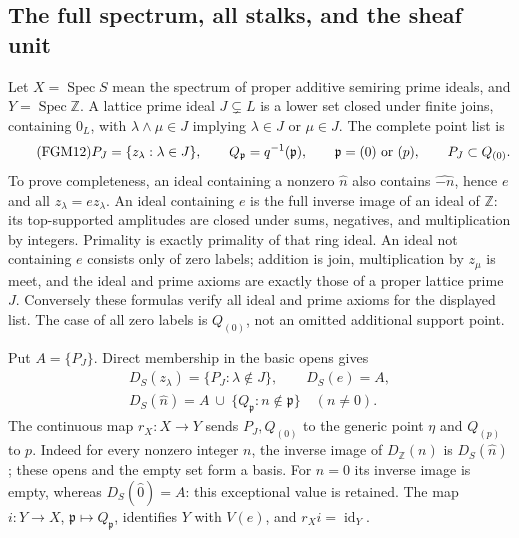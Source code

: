 \subsection{The full spectrum, all stalks, and the sheaf unit}
Let $X=\operatorname{Spec}S$ mean the spectrum of proper additive
semiring prime ideals, and $Y=\operatorname{Spec}\mathbb Z$.
A lattice prime ideal $J\subsetneq L$ is a lower set closed under
finite joins, containing $0_L$, with
$\lambda\wedge\mu\in J$ implying $\lambda\in J$ or $\mu\in J$.
The complete point list is
\begin{equation}\tag{FGM12}
 P_J=\{z_\lambda:\lambda\in J\},\qquad
 Q_{\mathfrak p}=q^{-1}(\mathfrak p),\qquad
 \mathfrak p=(0)\ \hbox{or}\ (p),\qquad P_J\subset Q_{(0)}.
\end{equation}
To prove completeness, an ideal containing a nonzero $\widehat n$
also contains $\widehat{-n}$, hence $e$ and all $z_\lambda=e z_\lambda$.
An ideal containing $e$ is the full inverse image of an ideal of
$\mathbb Z$: its top-supported amplitudes are closed under sums,
negatives, and multiplication by integers. Primality is exactly
primality of that ring ideal. An ideal not containing $e$ consists
only of zero labels; addition is join, multiplication by $z_\mu$
is meet, and the ideal and prime axioms are exactly those of a
proper lattice prime $J$. Conversely these formulas verify all
ideal and prime axioms for the displayed list. The case of all zero
labels is $Q_{(0)}$, not an omitted additional support point.

Put $A=\{P_J\}$. Direct membership in the basic opens gives
\begin{equation}\tag{FGM13}
 \begin{gathered}
 D_S(z_\lambda)=\{P_J:\lambda\notin J\},\qquad D_S(e)=A,\\
 D_S(\widehat n)=A\ \cup\ \{Q_{\mathfrak p}:n\notin\mathfrak p\}
 \quad(n\ne0).
 \end{gathered}
\end{equation}
The continuous map $r_X:X\to Y$ sends $P_J,Q_{(0)}$ to the generic
point $\eta$ and $Q_{(p)}$ to $p$. Indeed for every nonzero integer
$n$, the inverse image of $D_{\mathbb Z}(n)$ is $D_S(\widehat n)$;
these opens and the empty set form a basis. For $n=0$ its inverse
image is empty, whereas $D_S(\widehat0)=A$: this exceptional value
is retained. The map $i:Y\to X$, $\mathfrak p\mapsto Q_{\mathfrak p}$,
identifies $Y$ with $V(e)$, and $r_Xi=\operatorname{id}_Y$.

